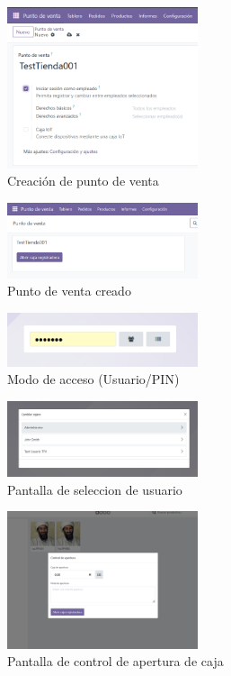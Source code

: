 \documentclass[a4paper,12pt]{article}
\begin{document}
\begin{figure}[h!]
    \centering
    \includegraphics[width=0.5\textwidth]{pr2odoo49-nuevoTPV.png}
    \caption{Creación de punto de venta}
\end{figure}
\FloatBarrier

\begin{figure}[h!]
    \centering
    \includegraphics[width=0.5\textwidth]{pr2odoo50-tpvCreado.png}
    \caption{Punto de venta creado}
\end{figure}
\FloatBarrier

\begin{figure}[h!]
    \centering
    \includegraphics[width=0.5\textwidth]{pr2odoo51-modoAcceso.png}
    \caption{Modo de acceso (Usuario/PIN)}
\end{figure}
\FloatBarrier

\begin{figure}[h!]
    \centering
    \includegraphics[width=0.5\textwidth]{pr2odoo52-escojerCajero.png}
    \caption{Pantalla de seleccion de usuario}
\end{figure}
\FloatBarrier

\begin{figure}[h!]
    \centering
    \includegraphics[width=0.5\textwidth]{pr2odoo53-controlAperturaCaja.png}
    \caption{Pantalla de control de apertura de caja}
\end{figure}
\FloatBarrier
\end{document}
